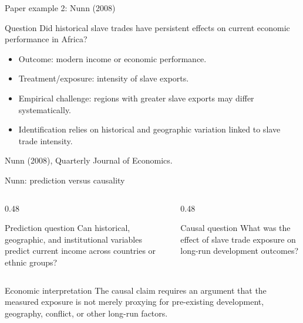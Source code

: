 \documentclass[aspectratio=169,11pt]{beamer}
\newcommand{\econ}[1]{\begin{exampleblock}{Economic interpretation}#1\end{exampleblock}}
\newcommand{\smallcite}[1]{{\scriptsize \textcolor{WLUGray}{#1}}}
\begin{document}
\begin{frame}{Paper example 2: Nunn (2008)}
\begin{block}{Question}
Did historical slave trades have persistent effects on current economic performance in Africa?
\end{block}
\begin{itemize}
  \item Outcome: modern income or economic performance.
  \item Treatment/exposure: intensity of slave exports.
  \item Empirical challenge: regions with greater slave exports may differ systematically.
  \item Identification relies on historical and geographic variation linked to slave trade intensity.
\end{itemize}
\smallcite{Nunn (2008), Quarterly Journal of Economics.}
\end{frame}

\begin{frame}{Nunn: prediction versus causality}
\begin{columns}
\begin{column}{0.48\textwidth}
\begin{block}{Prediction question}
Can historical, geographic, and institutional variables predict current income across countries or ethnic groups?
\end{block}
\end{column}
\begin{column}{0.48\textwidth}
\begin{alertblock}{Causal question}
What was the effect of slave trade exposure on long-run development outcomes?
\end{alertblock}
\end{column}
\end{columns}
\vspace{1em}
\econ{
The causal claim requires an argument that the measured exposure is not merely proxying for pre-existing development, geography, conflict, or other long-run factors.
}
\end{frame}
\end{document}
